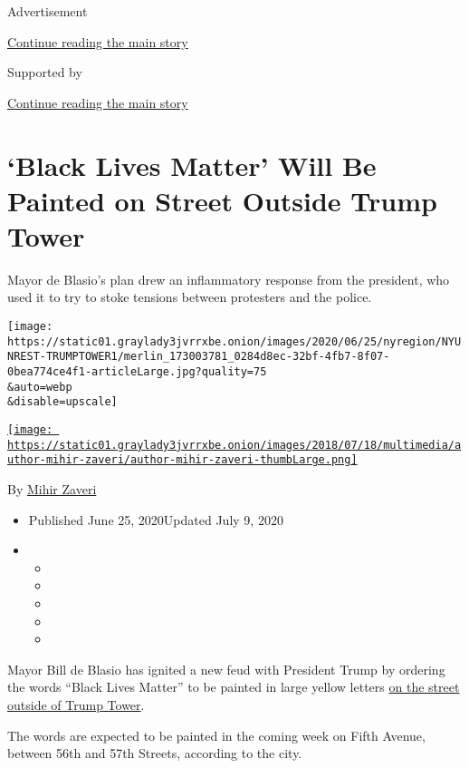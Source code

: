 Advertisement

\protect\hyperlink{after-top}{Continue reading the main story}

Supported by

\protect\hyperlink{after-sponsor}{Continue reading the main story}

\hypertarget{black-lives-matter-will-be-painted-on-street-outside-trump-tower}{%
\section{`Black Lives Matter' Will Be Painted on Street Outside Trump
Tower}\label{black-lives-matter-will-be-painted-on-street-outside-trump-tower}}

Mayor de Blasio's plan drew an inflammatory response from the president,
who used it to try to stoke tensions between protesters and the police.

\texttt{[image: https://static01.graylady3jvrrxbe.onion/images/2020/06/25/nyregion/NYUNREST-TRUMPTOWER1/merlin\_173003781\_0284d8ec-32bf-4fb7-8f07-0bea774ce4f1-articleLarge.jpg?quality=75\\\&auto=webp\\\&disable=upscale]}

\href{https://www.nytimes3xbfgragh.onion/by/mihir-zaveri}{\texttt{[image: https://static01.graylady3jvrrxbe.onion/images/2018/07/18/multimedia/author-mihir-zaveri/author-mihir-zaveri-thumbLarge.png]}}

By \href{https://www.nytimes3xbfgragh.onion/by/mihir-zaveri}{Mihir
Zaveri}

\begin{itemize}
\item
  Published June 25, 2020Updated July 9, 2020
\item
  \begin{itemize}
  \item
  \item
  \item
  \item
  \item
  \end{itemize}
\end{itemize}

Mayor Bill de Blasio has ignited a new feud with President Trump by
ordering the words ``Black Lives Matter'' to be painted in large yellow
letters
\href{https://www.nytimes3xbfgragh.onion/2020/07/09/nyregion/blm-trump-tower.html}{on
the street outside of Trump Tower}.

The words are expected to be painted in the coming week on Fifth Avenue,
between 56th and 57th Streets, according to the city.

